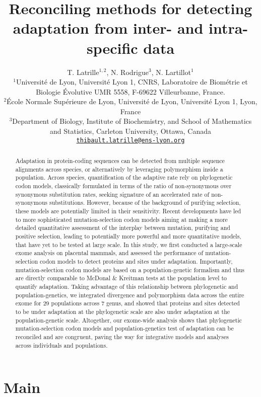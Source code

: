 \documentclass{article}
\title{Reconciling methods for detecting adaptation from inter- and intra-specific data}
\author{
	\large
	T. {Latrille}$^{1,2}$, N. {Rodrigue}$^{3}$, N. {Lartillot}$^{1}$\\
	\normalsize
	$^{1}$Université de Lyon, Université Lyon 1, CNRS, Laboratoire de Biométrie et Biologie Évolutive UMR 5558, F-69622 Villeurbanne, France.\\
	$^{2}$École Normale Supérieure de Lyon, Université de Lyon, Université Lyon 1, Lyon, France\\
	$^{3}$Department of Biology, Institute of Biochemistry, and School of Mathematics and Statistics, Carleton University, Ottawa, Canada \\
	\texttt{\href{mailto:thibault.latrille@ens-lyon.org}{thibault.latrille@ens-lyon.org}} \\
}
\begin{document}
\maketitle

\begin{abstract}
	Adaptation in protein-coding sequences can be detected from multiple sequence alignments across species, or alternatively by leveraging polymorphism inside a population.
	Across species, quantification of the adaptive rate rely on phylogenetic codon models, classically formulated in terms of the ratio of non-synonymous over synonymous substitution rates, seeking signature of an accelerated rate of non-synonymous substitutions.
	However, because of the background of purifying selection, these models are potentially limited in their sensitivity.
	Recent developments have led to more sophisticated mutation-selection codon models aiming at making a more detailed quantitative assessment of the interplay between mutation, purifying and positive selection, leading to potentially more powerful and more quantitative models, that have yet to be tested at large scale.
	In this study, we first conducted a large-scale exome analysis on placental mammals, and assessed the performance of mutation-selection codon models to detect proteins and sites under adaptation.
	Importantly, mutation-selection codon models are based on a population-genetic formalism and thus are directly comparable to McDonal \& Kreitman tests at the population level to quantify adaptation.
	Taking advantage of this relationship between phylogenetic and population-genetics, we integrated divergence and polymorphism data across the entire exome for 29 populations across 7 genus, and showed that proteins and sites detected to be under adaptation at the phylogenetic scale are also under adaptation at the population-genetic scale.
	Altogether, our exome-wide analysis shows that phylogenetic mutation-selection codon models and population-genetics test of adaptation can be reconciled and are congruent, paving the way for integrative models and analyses across individuals and populations.
\end{abstract}


\section*{Main}
\end{document}
